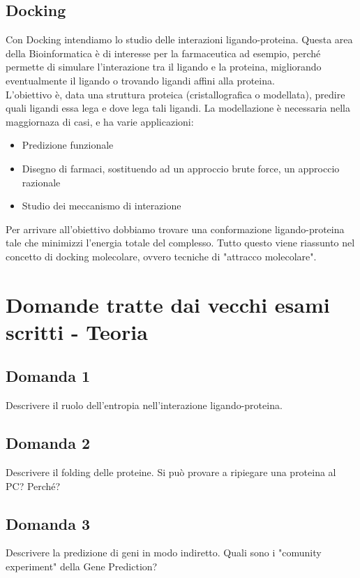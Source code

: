 \documentclass{article}
\begin{document}
\subsection*{Docking}
Con Docking intendiamo lo studio delle interazioni ligando-proteina. Questa area della Bioinformatica è di interesse per la farmaceutica ad esempio,
perché permette di simulare l'interazione tra il ligando e la proteina, migliorando eventualmente il ligando o trovando ligandi affini alla proteina.\\
L'obiettivo è, data una struttura proteica (cristallografica o modellata), predire quali ligandi essa lega e dove lega tali ligandi. La modellazione è necessaria nella maggiornaza di casi, e ha varie applicazioni:
\begin{itemize}
    \item Predizione funzionale
    \item Disegno di farmaci, sostituendo ad un approccio brute force, un approccio razionale
    \item Studio dei meccanismo di interazione
\end{itemize}
Per arrivare all'obiettivo dobbiamo trovare una conformazione ligando-proteina tale che minimizzi l'energia totale del complesso. Tutto questo viene riassunto nel concetto di docking molecolare, ovvero tecniche di "attracco molecolare".


\section*{Domande tratte dai vecchi esami scritti - Teoria}

\subsection*{Domanda 1}
Descrivere il ruolo dell'entropia nell'interazione ligando-proteina.

\subsection*{Domanda 2}
Descrivere il folding delle proteine. Si può provare a ripiegare una proteina al PC? Perché?

\subsection*{Domanda 3}
Descrivere la predizione di geni in modo indiretto. Quali sono i "comunity experiment" della Gene Prediction?
\end{document}
